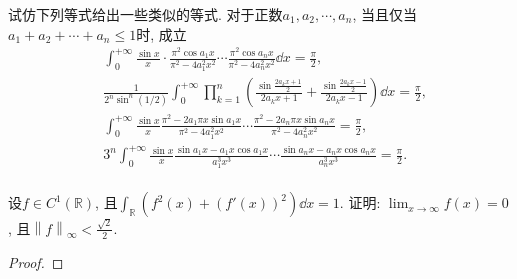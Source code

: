 \begin{quizb}
\woe 试仿下列等式给出一些类似的等式.
\tcbline
对于正数\(a_1,a_2,\cdots,a_n\), 当且仅当\(a_1+a_2+\cdots+a_n\leqslant 1\)时, 成立\[\begin{split}
&\int_{0}^{+\infty}\frac{\sin x}{x}\cdot\frac{\pi^2\cos a_1x}{\pi^2-4a_1^2x^2}\cdots\frac{\pi^2\cos a_nx}{\pi^2-4a_n^2x^2}\dd x=\frac{\pi}{2},\\
&\frac{1}{2^n\sin^n(1/2)}\int_{0}^{+\infty}\prod_{k=1}^{n}\left(\frac{\sin\frac{2a_kx+1}{2}}{2a_kx+1}+\frac{\sin\frac{2a_kx-1}{2}}{2a_kx-1}\right)\dd x=\frac{\pi}{2},\\
&\int_{0}^{+\infty}\frac{\sin x}{x}\frac{\pi^2-2a_1\pi x\sin a_1x}{\pi^2-4a_1^2x^2}\cdots\frac{\pi^2-2a_n\pi x\sin a_nx}{\pi^2-4a_n^2x^2}=\frac{\pi}{2},\\
&3^n\int_{0}^{+\infty}\frac{\sin x}{x}\frac{\sin a_1x-a_1x\cos a_1x}{a_1^3x^3}\cdots\frac{\sin a_nx-a_nx\cos a_nx}{a_n^3x^3}=\frac{\pi}{2}.\\
\end{split}\]
\tcbline
\begin{solution}
	
\end{solution}
\woe 设\(f\in C^1(\mathbb{R})\), 且\(\int_{\mathbb{R}}\left(f^2(x)+\left(f'(x)\right)^2\right)\dd x=1\). 证明: \(\lim_{x\rightarrow\infty}f(x)=0\), 且\(\left\|f\right\|_{\infty}<\frac{\sqrt{2}}{2}\).
\begin{proof}
	

\end{proof}
\end{quizb}
